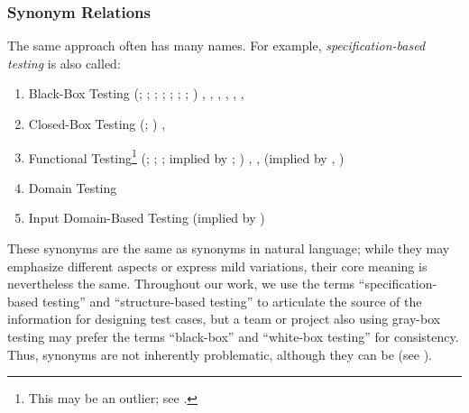 \subsubsection{Synonym Relations}
\label{syn-rels}

The same approach often has many names. For example,
\emph{specification-based testing} is also called:
\begin{enumerate}
    \item Black-Box Testing
          \ifnotpaper
              (\citealp[p.~9]{IEEE2022}; \citeyear[p.~8]{IEEE2021};
              \citeyear[p.~431]{IEEE2017}; \citealp[p.~5-10]{SWEBOK2024};
              \citealpISTQB{}; \citealp[p.~46 (without hyphen)]{Firesmith2015};
              \citealp[p.~344]{SakamotoEtAl2013}; \citealp[p.~399]{vanVliet2000})
          \else
              \cite[p.~9]{IEEE2022}, \cite{ISTQB}, \cite[p.~431]{IEEE2017},
              \cite[p.~5-10]{SWEBOK2024}, \cite[p.~8]{IEEE2021},
              \cite[p.~399]{vanVliet2000},
              \cite[p.~344]{SakamotoEtAl2013}
          \fi
    \item Closed-Box Testing
          \ifnotpaper
              (\citealp[p.~9]{IEEE2022}; \citeyear[p.~431]{IEEE2017})
          \else
              \cite[p.~9]{IEEE2022}, \cite[p.~431]{IEEE2017}
          \fi
    \item Functional Testing\footnote{This may be an outlier; see
              .}
          \ifnotpaper
              (\citealp[p.~196]{IEEE2017}; \citealp[p.~44]{Kam2008};
              \citealp[p.~399]{vanVliet2000}; implied by
              \citealp[p.~129]{IEEE2021}; \citeyear[p.~431]{IEEE2017})
          \else
              \cite[p.~196]{IEEE2017}, \cite[p.~399]{vanVliet2000},
              \cite[p.~44]{Kam2008} (implied by \cite[p.~431]{IEEE2017},
              \cite[p.~129]{IEEE2021})
          \fi
    \item Domain Testing \citep[p.~5-10]{SWEBOK2024}
    \item Input Domain-Based Testing (implied by \citealp[pp.~4-7 to
              4-8]{SWEBOK2014})
\end{enumerate}

These synonyms are the same as synonyms in natural language; while they may
emphasize different aspects or express mild variations, their core meaning
is nevertheless the same. Throughout our work, we use the terms
``specification-based testing'' and ``structure-based testing'' to articulate
the source of the information for designing test cases, but a team or project
also using gray-box testing may prefer the terms ``black-box'' and ``white-box
testing'' for consistency. Thus, synonyms are not inherently problematic,
although they can be (see ).


